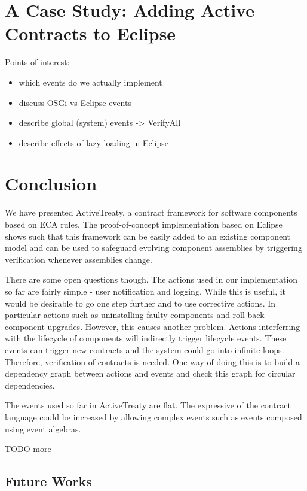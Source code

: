 \documentclass{llncs}
\begin{document}
\section{A Case Study: Adding Active Contracts to Eclipse}
\label{section:caseStudy}

Points of interest:

\begin{itemize}
	\item which events do we actually implement
  \item discuss OSGi vs Eclipse events
  \item describe global (system) events -> VerifyAll
  \item describe effects of lazy loading in Eclipse
\end{itemize}


\section{Conclusion}
\label{section:conclusion}

We have presented ActiveTreaty, a contract framework for software components based on ECA rules. The proof-of-concept implementation based on Eclipse shows such that this framework can be easily added to an existing component model and can be used to safeguard evolving component assemblies by triggering verification whenever assemblies change. 

There are some open questions though. The actions used in our implementation so far are fairly simple - user notification and logging. While this is useful, it would be desirable to go one step further and to use corrective actions.  In particular actions such as uninstalling faulty components and roll-back component upgrades. However, this causes another problem. Actions interferring with the lifecycle of components will indirectly trigger lifecycle events. These events can trigger new contracts and the system could go into infinite loops. Therefore, verification of contracts is needed. One way of doing this is to build a dependency graph between actions and events and check this graph for circular dependencies. 

The events used so far in ActiveTreaty are flat. The expressive of the contract language could be increased by allowing complex events such as events composed using event algebras. 

TODO more


\subsection{Future Works}
\end{document}
